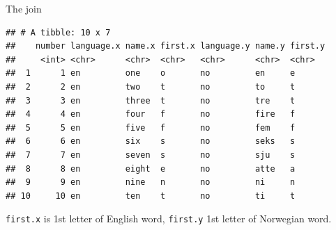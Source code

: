 \documentclass[ignorenonframetext,]{beamer}
\newenvironment{Shaded}{\begin{snugshade}}{\end{snugshade}}
\newcommand{\DataTypeTok}[1]{\textcolor[rgb]{0.13,0.29,0.53}{#1}}
\newcommand{\KeywordTok}[1]{\textcolor[rgb]{0.13,0.29,0.53}{\textbf{#1}}}
\newcommand{\NormalTok}[1]{#1}
\newcommand{\OperatorTok}[1]{\textcolor[rgb]{0.81,0.36,0.00}{\textbf{#1}}}
\newcommand{\StringTok}[1]{\textcolor[rgb]{0.31,0.60,0.02}{#1}}
\begin{document}
\begin{frame}[fragile]{The join}
\protect\hypertarget{the-join}{}

\scriptsize

\begin{Shaded}
\end{Shaded}

\begin{verbatim}
## # A tibble: 10 x 7
##    number language.x name.x first.x language.y name.y first.y
##     <int> <chr>      <chr>  <chr>   <chr>      <chr>  <chr>  
##  1      1 en         one    o       no         en     e      
##  2      2 en         two    t       no         to     t      
##  3      3 en         three  t       no         tre    t      
##  4      4 en         four   f       no         fire   f      
##  5      5 en         five   f       no         fem    f      
##  6      6 en         six    s       no         seks   s      
##  7      7 en         seven  s       no         sju    s      
##  8      8 en         eight  e       no         atte   a      
##  9      9 en         nine   n       no         ni     n      
## 10     10 en         ten    t       no         ti     t
\end{verbatim}

\normalsize

\texttt{first.x} is 1st letter of English word, \texttt{first.y} 1st
letter of Norwegian word.

\end{frame}
\end{document}
